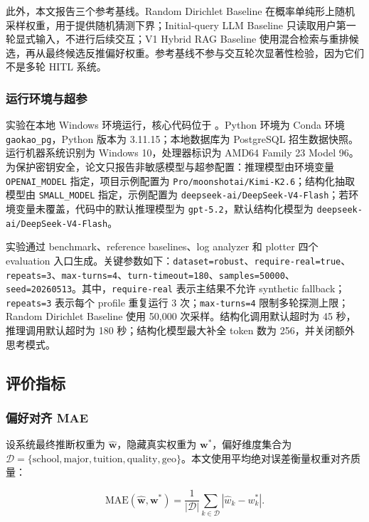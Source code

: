 此外，本文报告三个参考基线。Random Dirichlet Baseline 在概率单纯形上随机采样权重，用于提供随机猜测下界；Initial-query LLM Baseline 只读取用户第一轮显式输入，不进行后续交互；V1 Hybrid RAG Baseline 使用混合检索与重排候选，再从最终候选反推偏好权重。参考基线不参与交互轮次显著性检验，因为它们不是多轮 HITL 系统。

\subsubsection{运行环境与超参}

实验在本地 Windows 环境运行，核心代码位于 。Python 环境为 Conda 环境 \texttt{gaokao\_pg}，Python 版本为 3.11.15；本地数据库为 PostgreSQL 招生数据快照。运行机器系统识别为 Windows 10，处理器标识为 AMD64 Family 23 Model 96。为保护密钥安全，论文只报告非敏感模型与超参配置：推理模型由环境变量 \texttt{OPENAI\_MODEL} 指定，项目示例配置为 \texttt{Pro/moonshotai/Kimi-K2.6}；结构化抽取模型由 \texttt{SMALL\_MODEL} 指定，示例配置为 \texttt{deepseek-ai/DeepSeek-V4-Flash}；若环境变量未覆盖，代码中的默认推理模型为 \texttt{gpt-5.2}，默认结构化模型为 \texttt{deepseek-ai/DeepSeek-V4-Flash}。

实验通过 benchmark、reference baselines、log analyzer 和 plotter 四个 evaluation 入口生成。关键参数如下：\texttt{dataset=robust}、\texttt{require-real=true}、\texttt{repeats=3}、\texttt{max-turns=4}、\texttt{turn-timeout=180}、\texttt{samples=50000}、\texttt{seed=20260513}。其中，\texttt{require-real} 表示主结果不允许 synthetic fallback；\texttt{repeats=3} 表示每个 profile 重复运行 3 次；\texttt{max-turns=4} 限制多轮探测上限；Random Dirichlet Baseline 使用 50,000 次采样。结构化调用默认超时为 45 秒，推理调用默认超时为 180 秒；结构化模型最大补全 token 数为 256，并关闭额外思考模式。

\subsection{评价指标}

\subsubsection{偏好对齐 MAE}

设系统最终推断权重为 $\hat{\mathbf{w}}$，隐藏真实权重为 $\mathbf{w}^{*}$，偏好维度集合为 $\mathcal{D}=\{\text{school},\text{major},\text{tuition},\text{quality},\text{geo}\}$。本文使用平均绝对误差衡量权重对齐质量：

\[
\mathrm{MAE}(\hat{\mathbf{w}},\mathbf{w}^{*})
=\frac{1}{|\mathcal{D}|}\sum_{k\in\mathcal{D}}
|\hat{w}_{k}-w^{*}_{k}|.
\]

